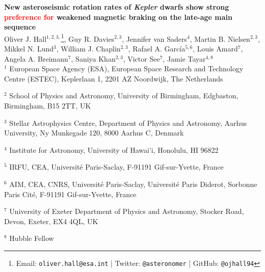 \documentclass[12pt]{article}
\newcommand{\rtwo}[1]{\textcolor{red}{{#1}}}
\renewcommand*{\thefootnote}{\fnsymbol{footnote}}
\begin{document}
\noindent\textbf{\LARGE{New asteroseismic rotation rates of \emph{Kepler} dwarfs show strong \rtwo{preference for} weakened magnetic braking on the late-age main sequence}}\\

\noindent Oliver J. Hall$^{1,2,3,}$\footnote[1]{Email: \texttt{oliver.hall@esa.int} | Twitter: \texttt{@asteronomer} | GitHub: \texttt{@ojhall94}},
	Guy R. Davies$^{2,3}$, 
	Jennifer van Saders$^{4}$,
	Martin B. Nielsen$^{2,3}$,
	Mikkel N. Lund$^{3}$, 
	William J. Chaplin$^{2,3}$, 
	Rafael A. Garc\'ia$^{5, 6}$, 
	Louis Amard$^{7}$,
	Angela A. Breimann$^{7}$, 
	Saniya Khan$^{2,3}$, 
	Victor See$^{7}$, 
	Jamie Tayar$^{4, 8}$
	\\
	
	\noindent $^{1}$ European Space Agency (ESA), European Space Research and Technology Centre (ESTEC), Keplerlaan 1, 2201 AZ Noordwijk, The Netherlands

	\noindent 	$^{2}$ School of Physics and Astronomy, University of Birmingham, Edgbaston, Birmingham, B15 2TT, UK

	\noindent 	$^{3}$ Stellar Astrophysics Centre, Department of Physics and Astronomy, Aarhus University, Ny Munkegade 120, 8000 Aarhus C, Denmark

	\noindent 	$^{4}$ Institute for Astronomy, University of Hawai'i, Honolulu, HI 96822

	\noindent 	$^{5}$ IRFU, CEA, Universit\'e Paris-Saclay, F-91191 Gif-sur-Yvette, France

	\noindent 	$^{6}$ AIM, CEA, CNRS, Universit\'e Paris-Saclay, Universit\'e Paris Diderot, Sorbonne Paris Cit\'e, F-91191 Gif-sur-Yvette, France

	\noindent 	$^{7}$ University of Exeter Department of Physics and Astronomy, Stocker Road, Devon, Exeter, EX4 4QL, UK
	
	\noindent $^{8}$ Hubble Fellow


\vspace{10mm}

\renewcommand*{\thefootnote}{\arabic{footnote}}
\setcounter{footnote}{0}
\end{document}
